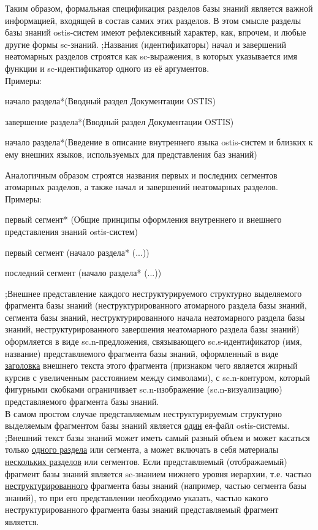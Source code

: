\begin{SCn}
{Таким образом, формальная спецификация разделов базы знаний является важной информацией, входящей в состав самих этих разделов. В этом смысле разделы базы знаний ostis-систем имеют рефлексивный характер, как, впрочем, и любые другие формы sc-знаний.
;Названия (идентификаторы) начал и завершений неатомарных разделов строятся как sc-выражения, в которых указывается имя функции и sc-идентификатор одного из её аргументов.\\
Примеры:
\begin{scnitemize}
    \item начало раздела*(Вводный раздел Документации OSTIS)
    \item завершение раздела*(Вводный раздел Документации OSTIS)
    \item начало раздела*(Введение в описание внутреннего языка ostis-систем и близких к ему внешних языков, используемых для представления баз знаний)
\end{scnitemize}
Аналогичным образом строятся названия первых и последних сегментов атомарных разделов, а также начал и завершений неатомарных разделов.\\
Примеры:
\begin{scnitemize}
    \item первый сегмент* (Общие принципы оформления внутреннего и внешнего представления знаний ostis-систем)
    \item первый сегмент (начало раздела* (...))
    \item последний сегмент (начало раздела* (...))
\end{scnitemize}
;Внешнее представление каждого неструктурируемого структурно выделяемого фрагмента базы знаний (неструктурированного атомарного раздела базы знаний, сегмента базы знаний, неструктурированного начала неатомарного раздела базы знаний, неструктурированного завершения неатомарного раздела базы знаний) оформляется в виде sc.n-предложения, связывающего sc.s-идентификатор (имя, название) представляемого фрагмента базы знаний, оформленный в виде \uline{заголовка} внешнего текста этого фрагмента (признаком чего является жирный курсив с увеличенным расстоянием между символами), с sc.n-контуром, который фигурными скобками ограничивает sc.n-изображение (sc.n-визуализацию) представляемого фрагмента базы знаний.\\
В самом простом случае представляемым неструктурируемым структурно выделяемым фрагментом базы знаний является \uline{один} ея-файл ostis-системы.
;Внешний текст базы знаний может иметь самый разный объем и может касаться только \uline{одного раздела} или сегмента, а может включать в себя материалы \uline{нескольких разделов} или сегментов. Если представляемый (отображаемый) фрагмент базы знаний является sc-знанием нижнего уровня иерархии, т.е. частью \uline{неструктурированного} фрагмента базы знаний (например, частью сегмента базы знаний), то при его представлении необходимо указать, частью какого неструктурированного фрагмента базы знаний представляемый фрагмент является.\\
}
\end{SCn}
